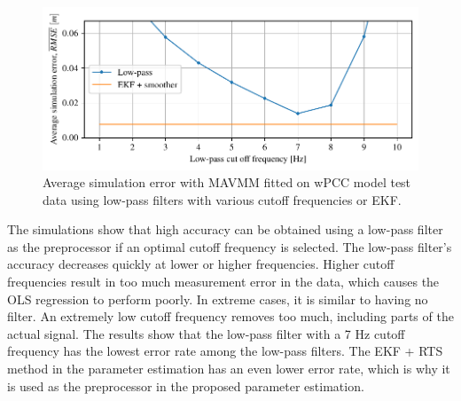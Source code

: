\begin{figure}[h!]
\centering
\includegraphics[width=1.0\textwidth]{kappa/images/6.pdf}
\caption{Average simulation error with MAVMM fitted on wPCC model test data using low-pass filters with various cutoff frequencies or EKF.}\label{\detokenize{06.31_results_noise:fig-lowpass-accuracy}}\end{figure} 
\noindent The simulations show that high accuracy can be obtained using a low-pass filter as the preprocessor if an optimal cutoff frequency is selected. The low-pass filter's accuracy decreases quickly at lower or higher frequencies. Higher cutoff frequencies result in too much measurement error in the data, which causes the OLS regression to perform poorly. In extreme cases, it is similar to having no filter. An extremely low cutoff frequency removes too much, including parts of the actual signal. The results show that the low-pass filter with a 7 Hz cutoff frequency has the lowest error rate among the low-pass filters. The EKF + RTS method in the parameter estimation has an even lower error rate, which is why it is used as the preprocessor in the proposed parameter estimation.
